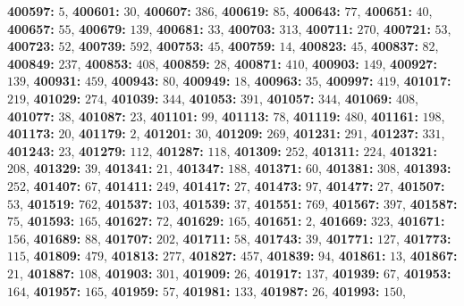 \textsf{\bfseries 400597:} $5$, \textsf{\bfseries 400601:} $30$, \textsf{\bfseries 400607:} $386$, \textsf{\bfseries 400619:} $85$, \textsf{\bfseries 400643:} $77$, \textsf{\bfseries 400651:} $40$, \textsf{\bfseries 400657:} $55$, \textsf{\bfseries 400679:} $139$, \textsf{\bfseries 400681:} $33$, \textsf{\bfseries 400703:} $313$, \textsf{\bfseries 400711:} $270$, \textsf{\bfseries 400721:} $53$, \textsf{\bfseries 400723:} $52$, \textsf{\bfseries 400739:} $592$, \textsf{\bfseries 400753:} $45$, \textsf{\bfseries 400759:} $14$, \textsf{\bfseries 400823:} $45$, \textsf{\bfseries 400837:} $82$, \textsf{\bfseries 400849:} $237$, \textsf{\bfseries 400853:} $408$, \textsf{\bfseries 400859:} $28$, \textsf{\bfseries 400871:} $410$, \textsf{\bfseries 400903:} $149$, \textsf{\bfseries 400927:} $139$, \textsf{\bfseries 400931:} $459$, \textsf{\bfseries 400943:} $80$, \textsf{\bfseries 400949:} $18$, \textsf{\bfseries 400963:} $35$, \textsf{\bfseries 400997:} $419$, \textsf{\bfseries 401017:} $219$, \textsf{\bfseries 401029:} $274$, \textsf{\bfseries 401039:} $344$, \textsf{\bfseries 401053:} $391$, \textsf{\bfseries 401057:} $344$, \textsf{\bfseries 401069:} $408$, \textsf{\bfseries 401077:} $38$, \textsf{\bfseries 401087:} $23$, \textsf{\bfseries 401101:} $99$, \textsf{\bfseries 401113:} $78$, \textsf{\bfseries 401119:} $480$, \textsf{\bfseries 401161:} $198$, \textsf{\bfseries 401173:} $20$, \textsf{\bfseries 401179:} $2$, \textsf{\bfseries 401201:} $30$, \textsf{\bfseries 401209:} $269$, \textsf{\bfseries 401231:} $291$, \textsf{\bfseries 401237:} $331$, \textsf{\bfseries 401243:} $23$, \textsf{\bfseries 401279:} $112$, \textsf{\bfseries 401287:} $118$, \textsf{\bfseries 401309:} $252$, \textsf{\bfseries 401311:} $224$, \textsf{\bfseries 401321:} $208$, \textsf{\bfseries 401329:} $39$, \textsf{\bfseries 401341:} $21$, \textsf{\bfseries 401347:} $188$, \textsf{\bfseries 401371:} $60$, \textsf{\bfseries 401381:} $308$, \textsf{\bfseries 401393:} $252$, \textsf{\bfseries 401407:} $67$, \textsf{\bfseries 401411:} $249$, \textsf{\bfseries 401417:} $27$, \textsf{\bfseries 401473:} $97$, \textsf{\bfseries 401477:} $27$, \textsf{\bfseries 401507:} $53$, \textsf{\bfseries 401519:} $762$, \textsf{\bfseries 401537:} $103$, \textsf{\bfseries 401539:} $37$, \textsf{\bfseries 401551:} $769$, \textsf{\bfseries 401567:} $397$, \textsf{\bfseries 401587:} $75$, \textsf{\bfseries 401593:} $165$, \textsf{\bfseries 401627:} $72$, \textsf{\bfseries 401629:} $165$, \textsf{\bfseries 401651:} $2$, \textsf{\bfseries 401669:} $323$, \textsf{\bfseries 401671:} $156$, \textsf{\bfseries 401689:} $88$, \textsf{\bfseries 401707:} $202$, \textsf{\bfseries 401711:} $58$, \textsf{\bfseries 401743:} $39$, \textsf{\bfseries 401771:} $127$, \textsf{\bfseries 401773:} $115$, \textsf{\bfseries 401809:} $479$, \textsf{\bfseries 401813:} $277$, \textsf{\bfseries 401827:} $457$, \textsf{\bfseries 401839:} $94$, \textsf{\bfseries 401861:} $13$, \textsf{\bfseries 401867:} $21$, \textsf{\bfseries 401887:} $108$, \textsf{\bfseries 401903:} $301$, \textsf{\bfseries 401909:} $26$, \textsf{\bfseries 401917:} $137$, \textsf{\bfseries 401939:} $67$, \textsf{\bfseries 401953:} $164$, \textsf{\bfseries 401957:} $165$, \textsf{\bfseries 401959:} $57$, \textsf{\bfseries 401981:} $133$, \textsf{\bfseries 401987:} $26$, \textsf{\bfseries 401993:} $150$, 
